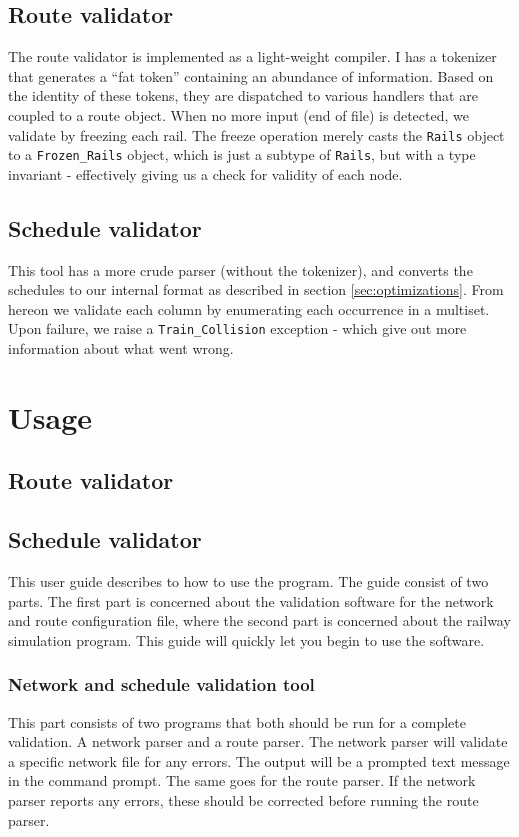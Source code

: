 \documentclass[10pt,a4paper]{article}
\def\Code#1{\texttt{#1}}
\begin{document}
\subsection{Route validator}
The route validator is implemented as a light-weight compiler. I has a tokenizer that generates a ``fat token'' containing an abundance of information. Based on the identity of these tokens, they are dispatched to various handlers that are coupled to a route object.
When no more input (end of file) is detected, we validate by freezing each rail. The freeze operation merely casts the \Code{Rails} object to a \Code{Frozen\_Rails} object, which is just a subtype of \Code{Rails}, but with a type invariant - effectively giving us a check for validity of each node.
\subsection{Schedule validator}
This tool has a more crude parser (without the tokenizer), and converts the schedules to our internal format as described in section \ref{sec:optimizations}. From hereon we validate each column by enumerating each occurrence in a multiset. Upon failure, we raise a \Code{Train\_Collision} exception - which give out more information about what went wrong.

\section{Usage}
\subsection{Route validator}

\subsection{Schedule validator}
This user guide describes to how to use the program. The guide consist of two parts. The first part is concerned about the validation software for the network and route configuration file, where the second part is concerned about the railway simulation program.
This guide will quickly let you begin to use the software.

\subsubsection{Network and schedule validation tool}
 
This part consists of two programs that both should be run for a complete validation. A network parser and a route parser.
The network parser will validate a specific network file for any errors. The output will be a prompted text message in the command prompt. The same goes for the route parser.
If the network parser reports any errors, these should be corrected before running the route parser.
\end{document}
